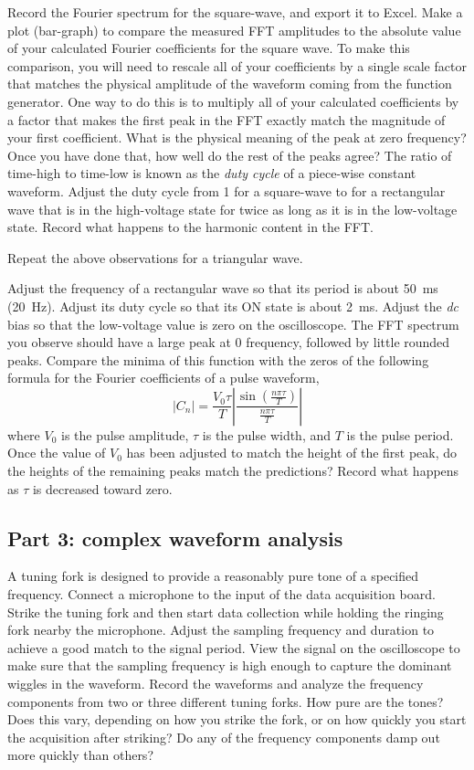 \documentclass{revtex4}
\begin{document}
Record the Fourier spectrum for the square-wave, and export it to Excel.
Make a plot (bar-graph) to compare the measured FFT amplitudes to the
absolute value of your calculated Fourier coefficients for the square wave.
To make this comparison, you will need to rescale all of your coefficients
by a single scale factor that matches the physical amplitude of the waveform
coming from the function generator.  One way to do this is to multiply all
of your calculated coefficients by a factor that makes the first peak in
the FFT exactly match the magnitude of your first coefficient.  What is
the physical meaning of the peak at zero frequency?  Once you
have done that, how well do the rest of the peaks agree?  The ratio of
time-high to time-low is known as the {\em duty cycle} of a piece-wise
constant waveform.  Adjust the duty cycle from 1 for a square-wave to
for a rectangular wave that is in the high-voltage state for twice as long
as it is in the low-voltage state.  Record what happens to the harmonic
content in the FFT.

Repeat the above observations for a triangular wave.

Adjust the frequency of a rectangular wave so that its period is about
50~ms (20~Hz). Adjust its duty cycle so that its ON state is about 2~ms.
Adjust the {\em dc} bias so that the low-voltage value is zero on the
oscilloscope.  The FFT spectrum you observe should have a large peak at
0 frequency, followed by little rounded peaks. Compare the minima of this
function with the zeros of the following formula for the Fourier coefficients
of a pulse waveform,
\begin{equation}
|C_n| = \frac{V_0\tau}{T}\left|\frac{\sin\left(\frac{n\pi\tau}{T}\right)}
{\frac{n\pi\tau}{T}}\right|
\end{equation}
where $V_0$ is the pulse amplitude, $\tau$ is the pulse width, and $T$ is the
pulse period.  Once the value of $V_0$ has been adjusted to match the height
of the first peak, do the heights of the remaining peaks match the predictions?
Record what happens as $\tau$ is decreased toward zero.

\subsection{Part 3: complex waveform analysis}

A tuning fork is designed to provide a reasonably pure tone of a
specified frequency. Connect a microphone to the input of the data
acquisition board.  Strike the tuning fork and then start data collection
while holding the ringing fork nearby the microphone.  Adjust the sampling
frequency and duration to achieve a good match to the signal period.  View
the signal on the oscilloscope to make sure that the sampling frequency is
high enough to capture the dominant wiggles in the waveform.  Record the
waveforms and analyze the frequency components from two or three different
tuning forks. How pure are the tones? Does this vary, depending on how you
strike the fork, or on how quickly you start the acquisition after striking?
Do any of the frequency components damp out more quickly than others?
\end{document}
